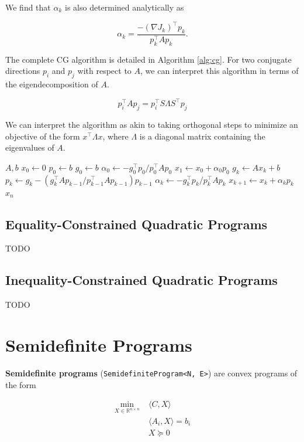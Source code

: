 \documentclass[12pt,titlepage]{report}
\begin{document}
	We find that \( \alpha_k \) is also determined analytically as
	
	\begin{equation}
		\boxed{\alpha_k = \frac{-(\nabla J_k)^\top p_k}{p_k^\top A p_k}. }
	\end{equation}
	
	The complete CG algorithm is detailed in Algorithm \ref{alg:cg}.  For two conjugate directions \( p_i \) and \( p_j \) with respect to \( A \), we can interpret this algorithm in terms of the eigendecomposition of \( A \).
	
	\begin{equation}
		p_i^\top A p_j = p_i^\top S \Lambda S^\top p_j
	\end{equation}
	
	We can interpret the algorithm as akin to taking orthogonal steps to minimize an objective of the form \( x^\top \Lambda x \), where \( \Lambda \) is a diagonal matrix containing the eigenvalues of \( A \).
	
	\begin{algorithm}[htbp!]
		\caption{Conjugate Gradient}
		\label{alg:cg}
		\begin{algorithmic}[1]
			\Require \( A, b \)
			\State \( x_0 \gets 0 \)
			\State \( p_0 \gets b \)
			\State \( g_0 \gets b \)
			\State \( \alpha_0 \gets -g_0^\top p_0 / p_0^\top A p_0 \)
			\State \( x_1 \gets x_0 + \alpha_0 p_0 \)
			\State \( g_k \gets Ax_k + b \)
			\State \( p_k \gets g_k - (g_k^\top A p_{k-1}/p_{k-1}^\top A p_{k-1}) p_{k-1} \)
			\State \( \alpha_k \gets -g_k^\top p_k / p_k^\top A p_k \)
			\State \( x_{k+1} \gets x_k + \alpha_k p_k \)
			\EndFor \\
			\Return \( x_n \)
		\end{algorithmic}
	\end{algorithm}
	
	\section{Equality-Constrained Quadratic Programs}
	
	TODO
	
	\section{Inequality-Constrained Quadratic Programs}
	
	TODO
	
	\chapter{Semidefinite Programs}
	
	\textbf{Semidefinite programs} (\texttt{SemidefiniteProgram<N, E>}) are convex programs of the form
	
	\begin{align}
		\min_{X \in \mathbb{R}^{n \times n}} \; & \langle C, X \rangle \\
		& \langle A_i, X \rangle = b_i \\
		& X \succeq 0
	\end{align}
	
	
\end{document}
